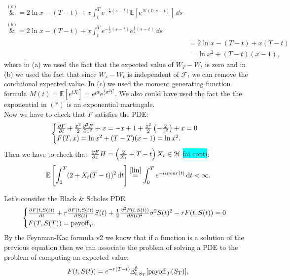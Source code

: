 \begin{example}{}{}{}
\begin{align*}
        \overset{(c)}&{=}
        2\ln x - (T-t) + x\int^T_t e^{-\frac{1}{2}(s-t)} \mathbb{E}\left[e^{\mathcal{N}(0,s-t)}\right] \,\dd s \\
        \overset{(b)}&{=}
        2\ln x - (T-t) + x\int^T_t e^{-\frac{1}{2}(s-t)}e^{\frac{1}{2}(s-t)} \,\dd s \\
        &=
        2\ln x - (T-t) + x(T-t) \\
        &=
        \ln x^2 + (T-t)(x-1),
    \end{align*}
    where in (a) we used the fact that the expected value of $W_T-W_t$ is zero and in (b) we used the fact that since $W_s-W_t$ is independent of $\mathcal{F}_t$ we can remove the conditional expected value. In (c) we used the moment generating function formula ${M(t)=\mathbb{E}[e^{tX}]=e^{\mu t}e^{{\frac {1}{2}}\sigma^{2}t^{2}}}$. We also could have used the fact the the exponential in $(*)$ is an exponential martingale.\\
    Now we have to check that $F$ satisfies the PDE:
    \begin{equation*}
        \begin{cases}
        \pdv{F}{t}(t,x) + \frac{x^2}{2}\pdv[2]{F}{x}(t,x) + x = -x+1+\frac{x^2}{2}\left(-\frac{2}{x^2}\right)+x = 0\\
        F(T,x) = \ln x^2 + (T-T)(x-1) = \ln x^2.
        \end{cases}
    \end{equation*}
    Then we have to check that $\pdv{F}{x}H = \left(\frac{2}{X_t}+T-t\right)X_t\in\mathcal{H}$ \colorbox{cyan}{fai conti}:
    \begin{equation*}
        \mathbb{E}\left[\int^T_0 (2 + X_t(T-t))^2\,\dd t\right] \overset{\eqref{lin}}{=} \int^T_0 e^{-linear(t)}\,\dd t < \infty.
    \end{equation*}
\end{example}
Let's consider the Black \& Scholes PDE
\begin{equation}
    \begin{cases}
    \pdv{F(t,S(t))}{t} + r\pdv{F(t,S(t))}{S(t)} S(t) + \frac{1}{2}\pdv[2]{F(t,S(t))}{S(t)}\sigma^2S(t)^2 - rF(t,S(t)) = 0\\
    F(T,S(T)) = \mbox{payoff}_T.
    \end{cases}
\end{equation}
By the Feynman-Kac formula v2 we know that if a function is a solution of the previous equation then we can associate the problem of solving a PDE to the problem of computing an expected value:
\begin{equation}
    F(t,S(t)) = e^{-r(T-t)}\mathbb{E}^{\hat{\mathbb{P}}}_{t,S_T}[\operatorname{payoff}_T(S_T)],
\end{equation}
